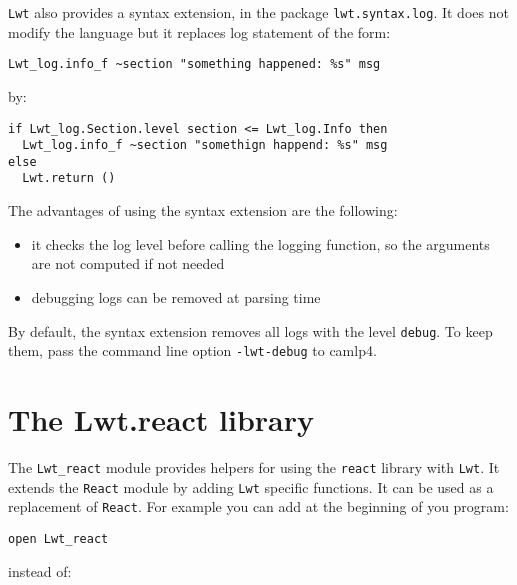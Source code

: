 \noindent
{\tt Lwt} also provides a syntax extension, in the package
{\tt lwt.syntax.log}. It does not modify the language but
it replaces log statement of the form:



\lstset{language=[Objective]Caml}\begin{lstlisting}
Lwt_log.info_f ~section "something happened: %s" msg
\end{lstlisting}
\medskip

\noindent
by:



\lstset{language=[Objective]Caml}\begin{lstlisting}
if Lwt_log.Section.level section <= Lwt_log.Info then
  Lwt_log.info_f ~section "somethign happend: %s" msg
else
  Lwt.return ()
\end{lstlisting}
\medskip

\noindent
The advantages of using the syntax extension are the following:



\begin{itemize}
\item  it checks the log level before calling the logging function, so
the arguments are not computed if not needed
\item  debugging logs can be removed at parsing time

\end{itemize}

By default, the syntax extension removes all logs with the level
{\tt debug}. To keep them, pass the command line option
{\tt -lwt-debug} to camlp4.



\section{ The Lwt.react library }

The {\tt Lwt\_react} module provides helpers for using the {\tt react}
library with {\tt Lwt}. It extends the {\tt React} module by adding
{\tt Lwt} specific functions. It can be used as a replacement of
{\tt React}. For example you can add at the beginning of you
program:



\lstset{language=[Objective]Caml}\begin{lstlisting}
open Lwt_react
\end{lstlisting}
\medskip

\noindent
instead of:



